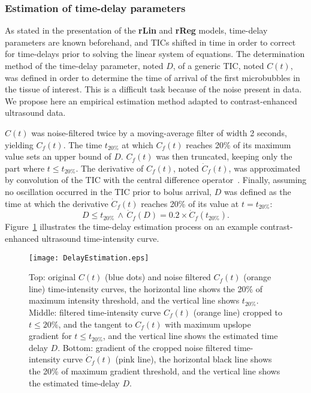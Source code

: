 \subsubsection{Estimation of time-delay parameters}\label{sec:estimationDelay}
As stated in the presentation of the \textbf{rLin} and \textbf{rReg} models, time-delay parameters are known beforehand, and TICs shifted in time in order to correct for time-delays prior to solving the linear system of equations.
The determination method of the time-delay parameter, noted $D$, of a generic TIC, noted $C\left(t\right)$, was defined in order to determine the time of arrival of the first microbubbles in the tissue of interest.
This is a difficult task because of the noise present in data. 
We propose here an empirical estimation method adapted to contrast-enhanced ultrasound data.

$C\left(t\right)$ was noise-filtered twice by a moving-average filter of width 2 seconds, yielding $C_f\left(t\right)$.
The time $t_{20\%}$ at which $C_f\left(t\right)$ reaches 20\% of its maximum value sets an upper bound of $D$.
$C_f\left(t\right)$ was then truncated, keeping only the part where $t \leq t_{20\%}$.
The derivative of $C_{f}\left(t\right)$, noted $\dot{C}_{f}\left(t\right)$, was approximated by convolution of the TIC with the central difference operator~\cite{Whittaker:2008wv}. %
Finally, assuming no oscillation occurred in the TIC prior to bolus arrival, $D$ was defined as the time at which the derivative $\dot{C}_{f}\left(t\right)$ reaches 20\% of its value at $t = t_{20\%}$:
\begin{equation}
D \leq t_{20\%}\,\wedge\,\dot{C}_{f}\left(D\right) = 0.2 \times \dot{C}_{f}\left(t_{20\%}\right).
\end{equation}
Figure~\ref{fig:delayEstimation} illustrates the time-delay estimation process on an example contrast-enhanced ultrasound time-intensity curve.

\begin{figure}
\centering
\texttt{[image: DelayEstimation.eps]}
\caption{Top: original $C(t)$ (blue dots) and noise filtered $C_{f}(t)$ (orange line) time-intensity curves, the horizontal line shows the 20\% of maximum intensity threshold, and the vertical line shows $t_{20\%}$. Middle: filtered time-intensity curve $C_{f}(t)$ (orange line) cropped to $t \leq 20\%$, and the tangent to $C_{f}(t)$ with maximum upslope gradient for $t \leq t_{20\%}$, and the vertical line shows the estimated time delay $D$. Bottom: gradient of the cropped noise filtered time-intensity curve $\dot{C}_{f}\left(t\right)$ (pink line), the horizontal black line shows the 20\% of maximum gradient threshold, and the vertical line shows the estimated time-delay $D$.}
\label{fig:delayEstimation}
\end{figure}


